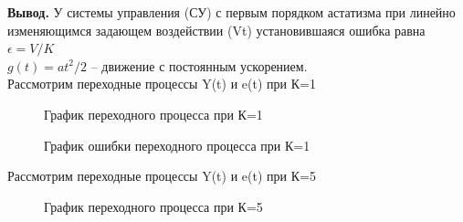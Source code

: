 \documentclass[a4paper, 11pt]{article}
\begin{document}
\textbf{Вывод.} У системы управления (СУ) с первым порядком астатизма при линейно изменяющимся задающем воздействии (Vt) установившаяся ошибка равна $\epsilon=V/K$\\


$g(t)=at^2/2$ – движение с постоянным ускорением.\\

Рассмотрим переходные процессы Y(t) и e(t) при К=1


\begin{figure}[h!]
    \caption{График переходного процесса при К=1}
    \label{two}
\end{figure}

\newpage

\begin{figure}[h!]
    \caption{График ошибки переходного процесса при К=1}
    \label{tree}
\end{figure}

Рассмотрим переходные процессы Y(t) и e(t) при К=5

\begin{figure}[h!]
    \caption{График переходного процесса при К=5}
    \label{two}
\end{figure}
\end{document}
